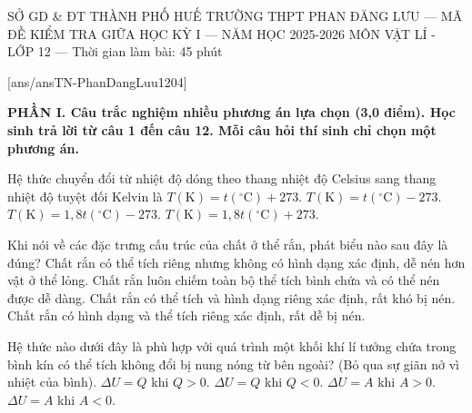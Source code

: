 

\def\toanlop{12}
\def\thoigian{45}
\def\namhoc{2025 - 2026}
\begin{dethi}
	{SỞ GD \& ĐT THÀNH PHỐ HUẾ}
	{TRƯỜNG THPT PHAN ĐĂNG LƯU --- MÃ ĐỀ \thedeso}
	{KIỂM TRA GIỮA HỌC KỲ I --- NĂM HỌC 2025-2026}
	{MÔN VẬT LÍ - LỚP 12 --- Thời gian làm bài: 45 phút}
\end{dethi}

[ans/ansTN-PhanDangLuu1204]

\noindent \textbf{PHẦN I. Câu trắc nghiệm nhiều phương án lựa chọn (3,0 điểm). Học sinh trả lời từ câu 1 đến câu 12. Mỗi câu hỏi thí sinh chỉ chọn một phương án.}
\vspace{0.2cm}

\begin{ex}%
	Hệ thức chuyển đổi từ nhiệt độ dóng theo thang nhiệt độ Celsius sang thang nhiệt độ tuyệt đối Kelvin là
	\choice
	{\True $T(\text{K})=t(^\circ\text{C})+273$.}
	{$T(\text{K})=t(^\circ\text{C})-273$.}
	{$T(\text{K})=1,8t(^\circ\text{C})-273$.}
	{$T(\text{K})=1,8t(^\circ\text{C})+273$.}
\end{ex}

\begin{ex}%
	Khi nói về các đặc trưng cấu trúc của chất ở thể rắn, phát biểu nào sau đây là đúng?
	\choice
	{Chất rắn có thể tích riêng nhưng không có hình dạng xác định, dễ nén hơn vật ở thể lỏng.}
	{Chất rắn luôn chiếm toàn bộ thể tích bình chứa và có thể nén được dễ dàng.}
	{\True Chất rắn có thể tích và hình dạng riêng xác định, rất khó bị nén.}
	{Chất rắn có hình dạng và thể tích riêng xác định, rất dễ bị nén.}
\end{ex}

\begin{ex}%
	Hệ thức nào dưới đây là phù hợp với quá trình một khối khí lí tưởng chứa trong bình kín có thể tích không đổi bị nung nóng từ bên ngoài? (Bỏ qua sự giãn nở vì nhiệt của bình).
	\choice
	{\True $\Delta U=Q$ khi $Q>0$.}
	{$\Delta U=Q$ khi $Q<0$.}
	{$\Delta U=A$ khi $A>0$.}
	{$\Delta U=A$ khi $A<0$.}
\end{ex}

